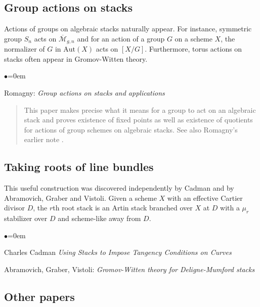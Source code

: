 \subsection{Group actions on stacks}
\label{subsection-group-actions}

\noindent
Actions of groups on algebraic stacks naturally appear.
For instance, symmetric group $S_n$ acts on $\overline{\mathcal{M}}_{g,n}$
and for an action of a group $G$ on a scheme $X$, the normalizer of $G$ in
$\text{Aut}(X)$ acts on $[X/G]$.  Furthermore, torus actions on stacks
often appear in Gromov-Witten theory.
\begin{list}{$\bullet$}{\leftmargin=0em}
\item Romagny:  \emph{Group actions on stacks and applications}
\cite{romagny_actions}
\begin{quote}
This paper makes precise what it means for a group to act on an algebraic
stack and proves existence of fixed points as well as existence of quotients
for actions of group schemes on algebraic stacks.  See also Romagny's earlier
note \cite{romagny_notes}.
\end{quote}
\smallskip
\end{list}

\subsection{Taking roots of line bundles}
\label{subsection-root-stacks}

\noindent
This useful construction was discovered independently by Cadman and by
Abramovich, Graber and Vistoli.  Given a scheme $X$ with an effective Cartier
divisor $D$, the $r$th root stack is an Artin stack branched over $X$ at $D$
with a $\mu_r$ stabilizer over $D$ and scheme-like away from $D$.

\begin{list}{$\bullet$}{\leftmargin=0em}
\item Charles Cadman
\emph{Using Stacks to Impose Tangency Conditions on Curves}
\cite{cadman}
\smallskip
\item Abramovich, Graber, Vistoli: \emph{Gromov-Witten theory for
Deligne-Mumford stacks} \cite{agv}
\end{list}

\subsection{Other papers}
\label{subsection-other}

